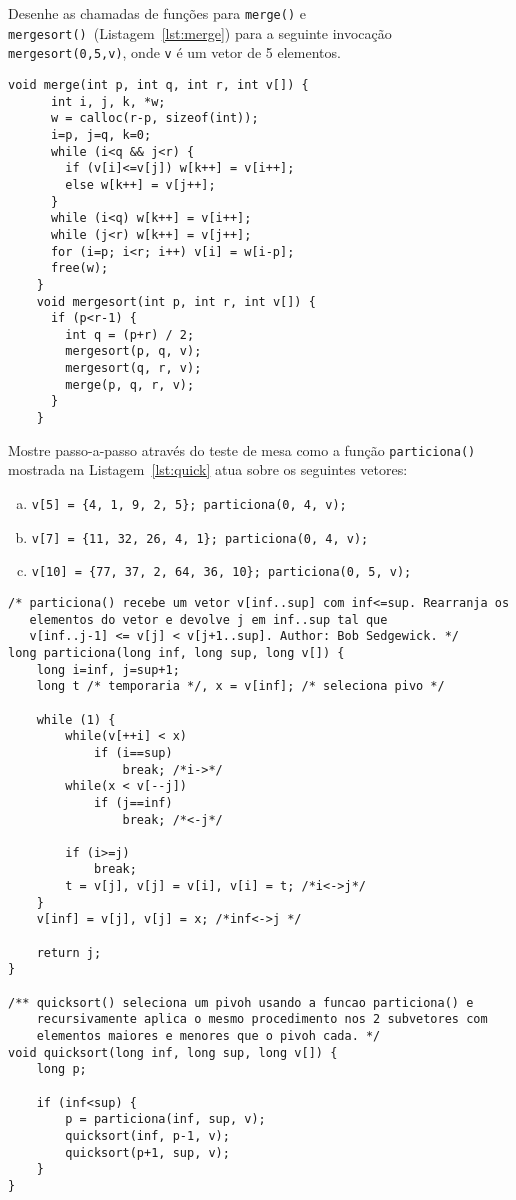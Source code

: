 \pagebreak

\exercise Desenhe as chamadas de funções para {\tt merge()} e {\tt
  mergesort()}~(Listagem~\ref{lst:merge}) para a seguinte invocação {\tt mergesort(0,5,v)}, onde
{\tt v} é um vetor de 5 elementos.

\begin{center}
  \begin{lstlisting}[label={lst:merge},caption={Algoritmo mergesort.}]
    void merge(int p, int q, int r, int v[]) {
      int i, j, k, *w;
      w = calloc(r-p, sizeof(int));
      i=p, j=q, k=0;
      while (i<q && j<r) {
        if (v[i]<=v[j]) w[k++] = v[i++];
        else w[k++] = v[j++];
      }
      while (i<q) w[k++] = v[i++];
      while (j<r) w[k++] = v[j++];
      for (i=p; i<r; i++) v[i] = w[i-p];
      free(w);
    }
    void mergesort(int p, int r, int v[]) {
      if (p<r-1) {
        int q = (p+r) / 2;
        mergesort(p, q, v);
        mergesort(q, r, v);
        merge(p, q, r, v);
      }
    }
  \end{lstlisting}
\end{center}

\pagebreak

\exercise Mostre passo-a-passo através do teste de mesa como a função 
{\tt particiona()} mostrada na Listagem~\ref{lst:quick} atua 
sobre os seguintes vetores:

\begin{enumerate}[a)]
\item {\tt v[5] = \{4, 1, 9, 2, 5\}; particiona(0, 4, v);}
\item {\tt v[7] = \{11, 32, 26, 4, 1\}; particiona(0, 4, v);}
\item {\tt v[10] = \{77, 37, 2, 64, 36, 10\}; particiona(0, 5, v);}
\end{enumerate}

\begin{lstlisting}[caption={Função de partionamento utilizada pelo algoritmo quicksort.},label={lst:quick}]
  /* particiona() recebe um vetor v[inf..sup] com inf<=sup. Rearranja os
   elementos do vetor e devolve j em inf..sup tal que 
   v[inf..j-1] <= v[j] < v[j+1..sup]. Author: Bob Sedgewick. */
long particiona(long inf, long sup, long v[]) {
	long i=inf, j=sup+1;
	long t /* temporaria */, x = v[inf]; /* seleciona pivo */

	while (1) {
		while(v[++i] < x)
			if (i==sup)
				break; /*i->*/
		while(x < v[--j])
			if (j==inf)
				break; /*<-j*/
             
		if (i>=j)
			break; 
		t = v[j], v[j] = v[i], v[i] = t; /*i<->j*/
	}
	v[inf] = v[j], v[j] = x; /*inf<->j */

	return j;
}

/** quicksort() seleciona um pivoh usando a funcao particiona() e
    recursivamente aplica o mesmo procedimento nos 2 subvetores com
    elementos maiores e menores que o pivoh cada. */
void quicksort(long inf, long sup, long v[]) {
	long p;

	if (inf<sup) {
		p = particiona(inf, sup, v);
		quicksort(inf, p-1, v);
		quicksort(p+1, sup, v);
	}
}
\end{lstlisting}

